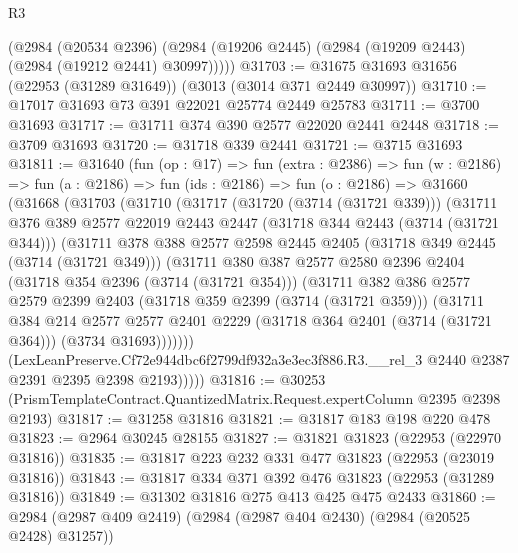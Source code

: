 \begin{lexlean}{R3}
\begin{coremodule}
      (@2984
        (@20534 @2396)
        (@2984 (@19206 @2445) (@2984 (@19209 @2443) (@2984 (@19212 @2441) @30997)))))
@31703 := @31675 @31693 @31656 (@22953 (@31289 @31649)) (@3013 (@3014 @371 @2449 @30997))
@31710 := @17017 @31693 @73 @391 @22021 @25774 @2449 @25783
@31711 := @3700 @31693
@31717 := @31711 @374 @390 @2577 @22020 @2441 @2448
@31718 := @3709 @31693
@31720 := @31718 @339 @2441
@31721 := @3715 @31693
@31811 := @31640
    (fun (op : @17) =>
    fun (extra : @2386) =>
    fun (w : @2186) =>
    fun (a : @2186) =>
    fun (ids : @2186) =>
    fun (o : @2186) =>
    @31660
      (@31668
        (@31703
          (@31710
            (@31717
              (@31720 (@3714 (@31721 @339)))
              (@31711
                @376
                @389
                @2577
                @22019
                @2443
                @2447
                (@31718 @344 @2443 (@3714 (@31721 @344)))
                (@31711
                  @378
                  @388
                  @2577
                  @2598
                  @2445
                  @2405
                  (@31718 @349 @2445 (@3714 (@31721 @349)))
                  (@31711
                    @380
                    @387
                    @2577
                    @2580
                    @2396
                    @2404
                    (@31718 @354 @2396 (@3714 (@31721 @354)))
                    (@31711
                      @382
                      @386
                      @2577
                      @2579
                      @2399
                      @2403
                      (@31718 @359 @2399 (@3714 (@31721 @359)))
                      (@31711
                        @384
                        @214
                        @2577
                        @2577
                        @2401
                        @2229
                        (@31718 @364 @2401 (@3714 (@31721 @364)))
                        (@3734 @31693)))))))
            (LexLeanPreserve.Cf72e944dbc6f2799df932a3e3ec3f886.R3.__rel_3
              @2440
              @2387
              @2391
              @2395
              @2398
              @2193)))))
@31816 := @30253 (PrismTemplateContract.QuantizedMatrix.Request.expertColumn @2395 @2398 @2193)
@31817 := @31258 @31816
@31821 := @31817 @183 @198 @220 @478
@31823 := @2964 @30245 @28155
@31827 := @31821 @31823 (@22953 (@22970 @31816))
@31835 := @31817 @223 @232 @331 @477 @31823 (@22953 (@23019 @31816))
@31843 := @31817 @334 @371 @392 @476 @31823 (@22953 (@31289 @31816))
@31849 := @31302 @31816 @275 @413 @425 @475 @2433
@31860 := @2984 (@2987 @409 @2419) (@2984 (@2987 @404 @2430) (@2984 (@20525 @2428) @31257))

\end{coremodule}
\end{lexlean}
